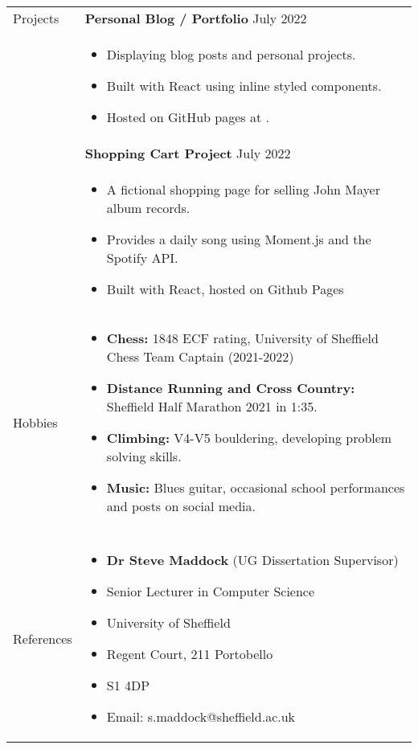 \documentclass[11pt]{article}
\begin{document}
\begin{minipage}[t][0pt]{\linewidth} %
    \begin{tabular}[t]{p{2cm} p{14cm}}
    	{Projects} &
		\textbf{Personal Blog / Portfolio}  \hfill July 2022 \\ &
		\begin{itemize}
			\renewcommand{\labelitemi}{$\diamond$}
			\item Displaying blog posts and personal projects.
			\item Built with React using inline styled components. 
			\item Hosted on GitHub pages at \href{jluong23.github.io/blog}{\color{Blue}{jluong23.github.io/blog}}.
		\end{itemize} \\ &

		\textbf{Shopping Cart Project}  \hfill July 2022 \\ &
		\begin{itemize}
			\renewcommand{\labelitemi}{$\diamond$}
			\item A fictional shopping page for selling John Mayer album records. 
			\item Provides a daily song using Moment.js and the Spotify API.
			\item Built with React, hosted on Github Pages
		\end{itemize} \\

		
	    {Hobbies} &
        \begin{itemize}
            \renewcommand{\labelitemi}{$\diamond$}
            \item \textbf{Chess:} 1848 ECF rating, University of Sheffield Chess Team Captain (2021-2022)
            \item \textbf{Distance Running and Cross Country:} Sheffield Half Marathon 2021 in 1:35.
            \item \textbf{Climbing:} V4-V5 bouldering, developing problem solving skills.
            \item \textbf{Music:} Blues guitar, occasional school performances and posts on social media.
        \end{itemize} \\
		\\

	{References} &
	    \begin{itemize}[label={}]
	        \item \textbf{Dr Steve Maddock} (UG Dissertation Supervisor)
        	\item Senior Lecturer in Computer Science
            \item University of Sheffield
            \item Regent Court, 211 Portobello
            \item S1 4DP
        	\item Email: s.maddock@sheffield.ac.uk 
	    \end{itemize}
    \end{tabular}
\end{minipage}
\end{document}
